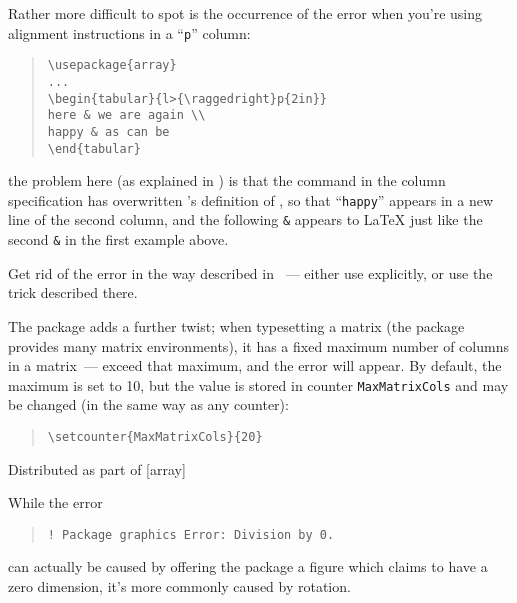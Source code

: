 {Rather more difficult to spot is the occurrence of the error when
you're using alignment instructions in a ``\texttt{p}'' column:
\begin{quote}
\begin{verbatim}
\usepackage{array}
...
\begin{tabular}{l>{\raggedright}p{2in}}
here & we are again \\
happy & as can be
\end{tabular}
\end{verbatim}
\end{quote}
the problem here (as explained in %
) is that the
 command in the column specification has overwritten
's definition of \texttt{\bsbs }, so that
``\texttt{happy}'' appears in a new line of the second column, and the
following \texttt{\&} appears to \LaTeX{} just like the second
\texttt{\&} in the first example above.

Get rid of the error in the way described in %
~--- either use
 explicitly, or use the  trick described
there.

The  package adds a further twist; when typesetting
a matrix (the package provides many matrix environments), it has a
fixed maximum number of columns in a matrix~--- exceed that maximum,
and the error will appear.  By default, the maximum is set to 10, but
the value is stored in counter \texttt{MaxMatrixCols} and may be
changed (in the same way as any counter):
\begin{quote}
\begin{verbatim}
\setcounter{MaxMatrixCols}{20}
\end{verbatim}
\end{quote}
\begin{ctanrefs}
\item[array.sty]Distributed as part of [array]
\end{ctanrefs}


While the error
\begin{quote}
\begin{verbatim}
! Package graphics Error: Division by 0.
\end{verbatim}
\end{quote}
can actually be caused by offering the package a figure which claims
to have a zero dimension, it's more commonly caused by rotation.

}
